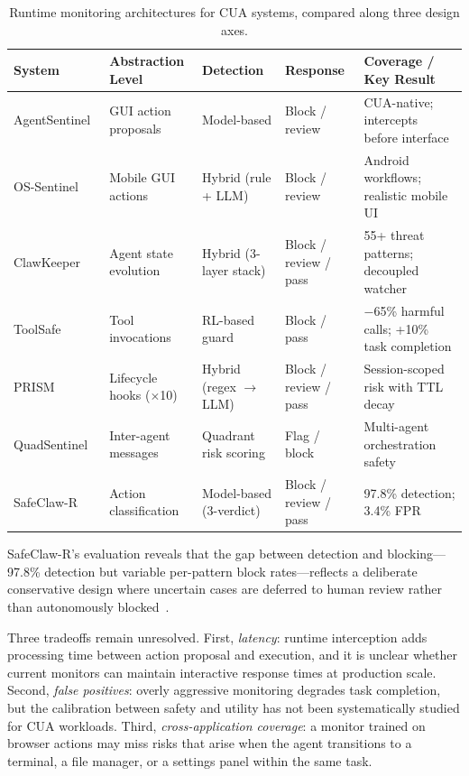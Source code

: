 \begin{table}[!ht]
\centering
\caption{Runtime monitoring architectures for CUA systems, compared along three design axes.}
\label{tab:monitoring-arch}
\footnotesize
\setlength{\tabcolsep}{3pt}
\begin{tabularx}{\textwidth}{@{}p{2.15cm} p{2.1cm} p{2.15cm} p{1.8cm} Y@{}}
\toprule
\textbf{System} & \textbf{Abstraction Level} & \textbf{Detection} & \textbf{Response} & \textbf{Coverage / Key Result} \\
\midrule
AgentSentinel~\cite{agentsentinel2025} & GUI action proposals & Model-based & Block / review & CUA-native; intercepts before interface \\
\midrule
OS-Sentinel~\cite{ossentinel2025} & Mobile GUI actions & Hybrid (rule + LLM) & Block / review & Android workflows; realistic mobile UI \\
\midrule
ClawKeeper~\cite{clawkeeper2026} & Agent state evolution & Hybrid (3-layer stack) & Block / review / pass & 55+ threat patterns; decoupled watcher \\
\midrule
ToolSafe~\cite{toolsafe2026} & Tool invocations & RL-based guard & Block / pass & $-$65\% harmful calls; +10\% task completion \\
\midrule
PRISM~\cite{openclawprism2026} & Lifecycle hooks ($\times$10) & Hybrid (regex $\to$ LLM) & Block / review / pass & Session-scoped risk with TTL decay \\
\midrule
QuadSentinel~\cite{quadsentinel2025} & Inter-agent messages & Quadrant risk scoring & Flag / block & Multi-agent orchestration safety \\
\midrule
SafeClaw-R~\cite{safeclawr2026} & Action classification & Model-based (3-verdict) & Block / review / pass & 97.8\% detection; 3.4\% FPR \\
\bottomrule
\end{tabularx}
\end{table}

SafeClaw-R's evaluation reveals that the gap between detection and blocking---97.8\% detection but variable per-pattern block rates---reflects a deliberate conservative design where uncertain cases are deferred to human review rather than autonomously blocked~\cite{safeclawr2026}.

Three tradeoffs remain unresolved. First, \emph{latency}: runtime interception adds processing time between action proposal and execution, and it is unclear whether current monitors can maintain interactive response times at production scale. Second, \emph{false positives}: overly aggressive monitoring degrades task completion, but the calibration between safety and utility has not been systematically studied for CUA workloads. Third, \emph{cross-application coverage}: a monitor trained on browser actions may miss risks that arise when the agent transitions to a terminal, a file manager, or a settings panel within the same task.

